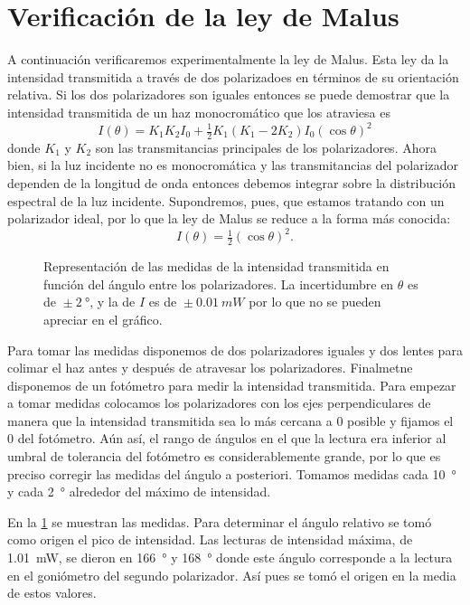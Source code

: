 \documentclass[12pt]{article}
\numberwithin{table}{section}
\numberwithin{figure}{section}
\numberwithin{equation}{section}
\newcommand{\unc}[2]{\ensuremath{{}\pm \SI{#1}{#2}}}
\begin{document}
\section{Verificación de la ley de Malus}
A continuación verificaremos experimentalmente la ley de Malus. Esta ley da la intensidad transmitida a través de dos polarizadoes en términos de su orientación relativa. Si los dos polarizadores son iguales entonces se puede demostrar que la intensidad transmitida de un haz monocromático que los atraviesa es
\begin{equation*}
	I(\theta) = K_1K_2I_0 + \tfrac{1}{2}K_1(K_1 - 2K_2)I_0 (\cos{\theta})^2 
\end{equation*}
donde \( K_1 \) y \( K_2 \) son las transmitancias principales de los polarizadores. Ahora bien, si la luz incidente no es monocromática y las transmitancias del polarizador dependen de la longitud de onda entonces debemos integrar sobre la distribución espectral de la luz incidente. Supondremos, pues, que estamos tratando con un polarizador ideal, por lo que la ley de Malus se reduce a la forma más conocida:
\begin{equation} \label{eqn:malus}
	I(\theta) = \tfrac{1}{2} (\cos{\theta})^2.
\end{equation}

\begin{figure}[htb]
	\centering \small \sffamily
	
	\caption{Representación de las medidas de la intensidad transmitida en función del ángulo entre los polarizadores. La incertidumbre en \( \theta \) es de \unc{2}{\degree}, y la de \( I \) es de \unc{0.01}{mW} por lo que no se pueden apreciar en el gráfico.}
	\label{fig:malus-1}
\end{figure}

Para tomar las medidas disponemos de dos polarizadores iguales y dos lentes para colimar el haz antes y después de atravesar los polarizadores. Finalmetne disponemos de un fotómetro para medir la intensidad transmitida. Para empezar a tomar medidas colocamos los polarizadores con los ejes perpendiculares de manera que la intensidad transmitida sea lo más cercana a 0 posible y fijamos el 0 del fotómetro. Aún así, el rango de ángulos en el que la lectura era inferior al umbral de tolerancia del fotómetro es considerablemente grande, por lo que es preciso corregir las medidas del ángulo a posteriori. Tomamos medidas cada \SI{10}{\degree} y cada \SI{2}{\degree} alrededor del máximo de intensidad. 

En la \cref{fig:malus-1} se muestran las medidas. Para determinar el ángulo relativo se tomó como origen el pico de intensidad. Las lecturas de intensidad máxima, de \SI{1.01}{mW}, se dieron en \SI{166}{\degree} y \SI{168}{\degree} donde este ángulo corresponde a la lectura en el goniómetro del segundo polarizador. Así pues se tomó el origen en la media de estos valores. 
\end{document}
